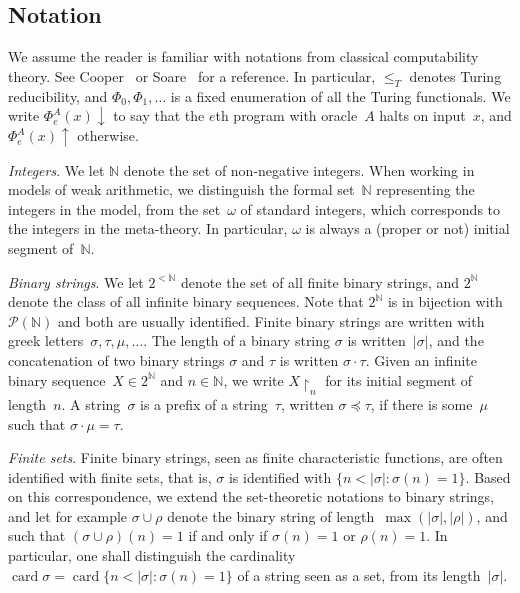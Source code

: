 \documentclass{article}
\def\NN{\mathbb{N}}
\def\P{\mathcal{P}}
\newcommand{\converge}{\!\!\downarrow}
\newcommand{\diverge}{\!\!\uparrow}
\newcommand{\ludovic}[1]{\textcolor{blue}{#1}}
\newcommand{\ISig}{\mathsf{I}\Sigma^0}
\newcommand{\card}{\operatorname{card}}
\newcommand{\uh}{\upharpoonright}
\newcommand{\Sub}[1]{{#1}\mbox{-}\mathsf{Subset}}
\newcommand{\RCA}{\mathsf{RCA}}
\numberwithin{theorem}{section}
\theoremstyle{definition}
\begin{document}


\subsection{Notation}

We assume the reader is familiar with notations from classical computability theory. See Cooper~\cite{cooper2004computability} or Soare~\cite{soare2016turing} for a reference. In particular, $\leq_T$ denotes Turing reducibility, and $\Phi_0, \Phi_1, \dots$ is a fixed enumeration of all the Turing functionals.
We write $\Phi_e^A(x)\converge$ to say that the $e$th program with oracle~$A$ halts on input~$x$, and $\Phi_e^A(x)\diverge$ otherwise.

\emph{Integers}. We let $\NN$ denote the set of non-negative integers. When working in models of weak arithmetic, we distinguish the formal set~$\NN$ representing the integers in the model, from the set~$\omega$ of standard integers, which corresponds to the integers in the meta-theory. In particular, $\omega$ is always a (proper or not) initial segment of~$\NN$.

\emph{Binary strings}. We let $2^{<\NN}$ denote the set of all finite binary strings, and $2^\NN$ denote the class of all infinite binary sequences. Note that $2^\NN$ is in bijection with $\P(\NN)$ and both are usually identified.
Finite binary strings are written with greek letters~$\sigma, \tau, \mu, \dots$. The length of a binary string $\sigma$ is written~$|\sigma|$, and the concatenation of two binary strings $\sigma$ and $\tau$ is written $\sigma \cdot \tau$. Given an infinite binary sequence~$X \in 2^\NN$ and $n \in \NN$, we write $X \uh_n$ for its initial segment of length~$n$. A string~$\sigma$ is a prefix of a string~$\tau$, written $\sigma \preceq \tau$, if there is some~$\mu$ such that $\sigma \cdot \mu = \tau$.

\emph{Finite sets}. Finite binary strings, seen as finite characteristic functions, are often identified with finite sets, that is, $\sigma$ is identified with $\{ n < |\sigma| : \sigma(n) = 1 \}$. Based on this correspondence, we extend the set-theoretic notations to binary strings, and let for example $\sigma \cup \rho$ denote the binary string of length~$\max(|\sigma|, |\rho|)$, and such that $(\sigma \cup \rho)(n) = 1$ if and only if $\sigma(n) = 1$ or $\rho(n) = 1$.
In particular, one shall distinguish the cardinality $\card \sigma = \card \{ n < |\sigma| : \sigma(n) = 1 \}$ of a string seen as a set, from its length~$|\sigma|$.
\end{document}

